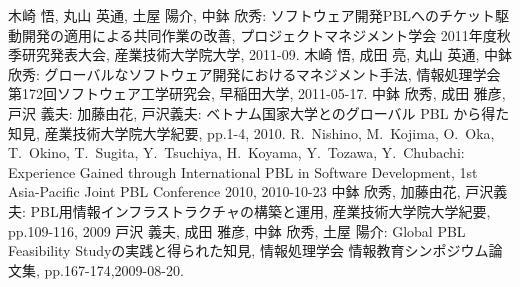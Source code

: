 \documentclass[a4j,twoside]{jarticle}
\newcommand{\me}{中鉢 欣秀}
\newcommand{\meen}{Y.~Chubachi}
\begin{document}
\begin{multicols}{2}
\begin{thebibliography}{99}
		 木崎 悟, 丸山 英通, 土屋 陽介, \me: ソフトウェア開発PBLへのチケット駆動開発の適用による共同作業の改善, プロジェクトマネジメント学会 2011年度秋季研究発表大会, 産業技術大学院大学, 2011-09.
		 木崎 悟, 成田 亮, 丸山 英通, \me: グローバルなソフトウェア開発におけるマネジメント手法, 情報処理学会 第172回ソフトウェア工学研究会, 早稲田大学, 2011-05-17.
		 \me, 成田 雅彦, 戸沢 義夫: 加藤由花, 戸沢義夫: ベトナム国家大学とのグローバル PBL から得た知見, 産業技術大学院大学紀要, pp.1-4, 2010. 
		 R.~Nishino, M.~Kojima, O.~Oka, T.~Okino, T.~Sugita, Y.~Tsuchiya, H.~Koyama, Y.~Tozawa, \meen: Experience Gained through International PBL in Software Development, 1st Asia-Pacific Joint PBL Conference 2010, 2010-10-23
		 \me, 加藤由花, 戸沢義夫: PBL用情報インフラストラクチャの構築と運用, 産業技術大学院大学紀要, pp.109-116, 2009
		 戸沢 義夫, 成田 雅彦, \me, 土屋 陽介: Global PBL Feasibility Studyの実践と得られた知見, 情報処理学会 情報教育シンポジウム論文集, pp.167-174,2009-08-20.

\end{thebibliography}
\end{multicols}
\end{document}
